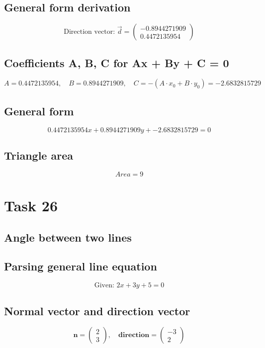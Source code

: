 \documentclass{article}
\begin{document}
\subsection*{ \vspace{1em} General form derivation}
\[
\text{Direction vector: } \vec{d} = \begin{pmatrix}-0.8944271909 \\ 0.4472135954\end{pmatrix}
\]
\subsection*{ \vspace{1em} Coefficients A, B, C for Ax + By + C = 0}
\[
A = 0.4472135954,\quad B = 0.8944271909,\quad C = - (A \cdot x_0 + B \cdot y_0) = -2.6832815729
\]
\subsection*{ \vspace{1em} General form}
\[
0.4472135954x + 0.8944271909y + -2.6832815729 = 0
\]
\subsection*{ \vspace{1em} Triangle area}
\[
Area = 9
\]
\bigskip

\hrulefill
\bigskip

\section*{Task 26}

\subsection*{Angle between two lines}
\subsection*{ \vspace{1em} Parsing general line equation}
\[
\text{Given: } 2x + 3y + 5 = 0
\]
\subsection*{ \vspace{1em} Normal vector and direction vector}
\[
\mathbf{n} = \begin{pmatrix}2 \\ 3\end{pmatrix}, \quad
           \mathbf{direction} = \begin{pmatrix}-3 \\ 2\end{pmatrix}
\]
\end{document}
